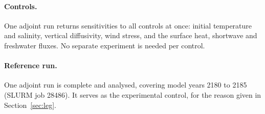 \paragraph{Controls.}
One adjoint run returns sensitivities to all controls at once: initial
temperature and salinity, vertical diffusivity, wind stress, and the surface
heat, shortwave and freshwater fluxes. No separate experiment is needed per
control.

\paragraph{Reference run.}
One adjoint run is complete and analysed, covering model years 2180 to 2185
(SLURM job 28486). It serves as the experimental control, for the reason given in
Section~\ref{sec:leg}.

